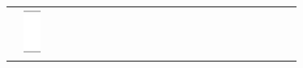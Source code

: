 \documentclass[10pt]{article}
\begin{document}
\begin{center}
\begin{tabular}{|c|c|c|c|c|c|c|c|c|c|c|c|c|c|c|c|c|c|c|c|c|c|c|c|}
 & \includegraphics[max width=\textwidth]{2024_11_21_0c267759828927e3a26dg-09(1)}

\end{tabular}
\end{center}
\end{document}

